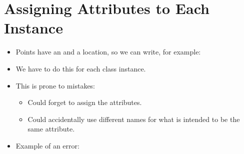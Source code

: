\documentclass[letterpaper,10pt,english]{sphinxmanual}
\begin{document}
\section{Assigning Attributes to Each Instance}
\label{\detokenize{lecture_notes/lec18_classes1:assigning-attributes-to-each-instance}}\begin{itemize}
\item {} 
Points have an  and a  location, so we can write, for
example:

\begin{sphinxVerbatim}[commandchars=\\\{\}]
   
  
  
  
    
\end{sphinxVerbatim}

\item {} 
We have to do this for each class instance.

\item {} 
This is prone to mistakes:
\begin{itemize}
\item {} 
Could forget to assign the attributes.

\item {} 
Could accidentally use different names for what is intended to be
the same attribute.

\end{itemize}

\item {} 
Example of an error:

\begin{sphinxVerbatim}[commandchars=\\\{\}]
  
  
        
\end{sphinxVerbatim}

\end{itemize}
\end{document}
